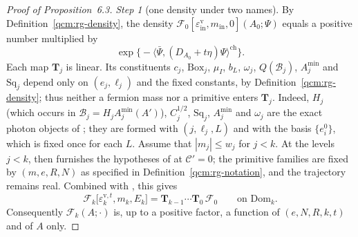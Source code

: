 \documentclass[11pt,letterpaper,reqno]{amsart}
\theoremstyle{definition}
\begin{document}
\begin{proof}[Proof of Proposition~6.3]
\emph{Step 1} (one density under two names).
By Definition~\ref{qcm:rg-density}, the density $\mathscr F_0[\varepsilon^{\mathrm v}_{\mathrm{in}},\allowbreak m_{\mathrm{in}},\allowbreak 0](A_0;\Psi)$ equals a positive number multiplied by
\begin{equation*}
\exp\bigl\{-\langle\bar\Psi,(D_{A_0}+t\eta)\Psi\rangle^{\mathrm{ch}}\bigr\}.
\end{equation*}
Each map $\mathbf T_j$ is linear. Its constituents $c_j$, $\mathrm{Box}_j$, $\mu_I$, $b_L$, $\omega_j$, $Q(\mathscr B_j)$, $A_j^{\min}$ and $\mathrm{Sq}_j$ depend only on $(e_j,\ell_j)$ and the fixed constants, by Definition~\ref{qcm:rg-density};
thus neither a fermion mass nor a primitive enters $\mathbf T_j$.
Indeed, $H_j$ (which occurs in $\mathscr B_j=H_jA^{\min}_j(A')$), $C_j^{1/2}$, $\mathrm{Sq}_j$, $A^{\min}_j$ and $\omega_j$ are the exact photon objects of \cite[Section~10.5, equations~(10.21)--(10.29), and Section~13.3]{QEDConstruction};
they are formed with $(j,\ell_j,L)$ and with the basis $\{e_i^0\}$, which is fixed once for each $L$.
Assume that $|m_j|\le w_j$ for $j<k$.
At the levels $j<k$, \cite[Proposition~16.2]{QEDConstruction} then furnishes the hypotheses of \cite[Theorem~14.8, equations~(14.47)--(14.48)]{QEDConstruction} at $\mathscr C'=0$; the primitive families are fixed by $(m,e,R,N)$ as specified in Definition~\ref{qcm:rg-notation}, and the trajectory remains real.
Combined with \cite[Proposition~10.4]{QEDConstruction}, this gives
\begin{equation*}
\mathscr F_k\bigl[\varepsilon^{\mathrm v,t}_k,m_k,E_k\bigr]=\mathbf T_{k-1}\cdots\mathbf T_0\,\mathscr F_0\qquad\text{on }\mathrm{Dom}_k .
\end{equation*}
Consequently $\mathscr F_k(A;\cdot)$ is, up to a positive factor, a function of $(e,N,R,k,t)$ and of $A$ only.


\end{proof}
\end{document}
